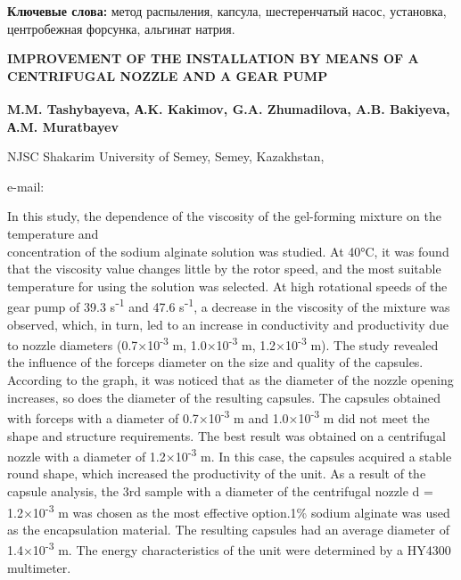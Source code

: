 {\bfseries Ключевые слова:} метод распыления, капсула, шестеренчатый насос,
установка, центробежная форсунка, альгинат натрия.

\begin{articleheader}
{\bfseries IMPROVEMENT OF THE INSTALLATION BY MEANS OF A CENTRIFUGAL NOZZLE
AND A GEAR PUMP}

{\bfseries
M.M. Tashybayeva\textsuperscript{\envelope },
А.K. Kakimov,
G.A. Zhumadilova,
A.B. Bakiyeva,
А.M. Muratbayev
}
\end{articleheader}

\begin{affiliation}
NJSC Shakarim University of Semey, Semey, Kazakhstan,

e-mail: \href{mailto:marzhan06081990@gmail.com}{}
\end{affiliation}

In this study, the dependence of the viscosity of the gel-forming
mixture on the temperature and \\concentration of the sodium alginate
solution was studied. At 40°C, it was found that the viscosity value
changes little by the rotor speed, and the most suitable temperature for
using the solution was selected. At high rotational speeds of the gear
pump of 39.3 s⁻\textsuperscript{1} and 47.6 s⁻\textsuperscript{1}, a
decrease in the viscosity of the mixture was observed, which, in turn,
led to an increase in conductivity and productivity due to nozzle
diameters (0.7×10\textsuperscript{-3} m, 1.0×10\textsuperscript{-3} m,
1.2×10\textsuperscript{-3} m). The study revealed the influence of the
forceps diameter on the size and quality of the capsules. According to
the graph, it was noticed that as the diameter of the nozzle opening
increases, so does the diameter of the resulting capsules. The capsules
obtained with forceps with a diameter of 0.7×10\textsuperscript{-3} m
and 1.0×10\textsuperscript{-3} m did not meet the shape and structure
requirements. The best result was obtained on a centrifugal nozzle with
a diameter of 1.2×10\textsuperscript{-3} m. In this case, the capsules
acquired a stable round shape, which increased the productivity of the
unit. As a result of the capsule analysis, the 3rd sample with a
diameter of the centrifugal nozzle d = 1.2×10\textsuperscript{-3} m was
chosen as the most effective option.1\% sodium alginate was used as the
encapsulation material. The resulting capsules had an average diameter
of 1.4×10\textsuperscript{-3} m. The energy characteristics of the unit
were determined by a HY4300 multimeter.

